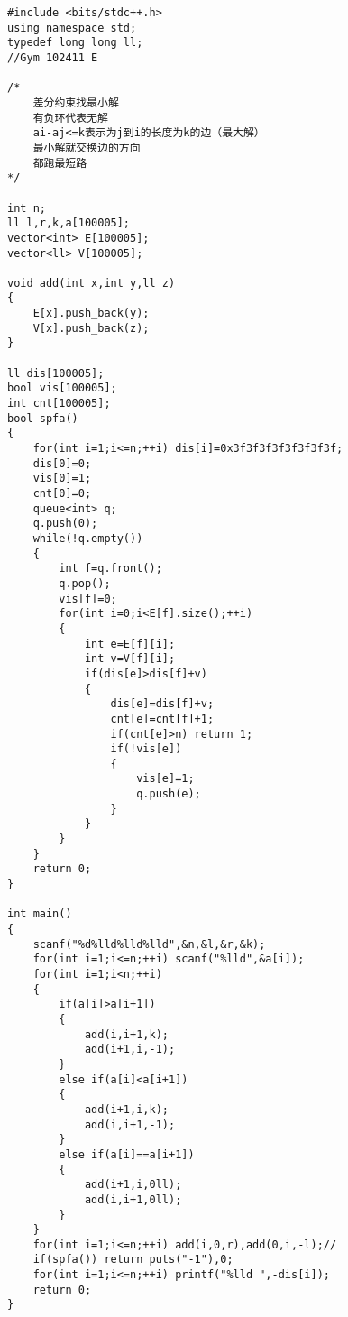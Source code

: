 ﻿\begin{lstlisting}
#include <bits/stdc++.h>
using namespace std;
typedef long long ll;
//Gym 102411 E

/*
	差分约束找最小解
	有负环代表无解
	ai-aj<=k表示为j到i的长度为k的边（最大解）
	最小解就交换边的方向
	都跑最短路
*/
 
int n;
ll l,r,k,a[100005];
vector<int> E[100005];
vector<ll> V[100005];
 
void add(int x,int y,ll z)
{
	E[x].push_back(y);
	V[x].push_back(z);
}
 
ll dis[100005];
bool vis[100005];
int cnt[100005];
bool spfa()
{
	for(int i=1;i<=n;++i) dis[i]=0x3f3f3f3f3f3f3f3f;
	dis[0]=0;
	vis[0]=1;
	cnt[0]=0;
	queue<int> q;
	q.push(0);
	while(!q.empty())
	{
		int f=q.front();
		q.pop();
		vis[f]=0;
		for(int i=0;i<E[f].size();++i)
		{
			int e=E[f][i];
			int v=V[f][i];
			if(dis[e]>dis[f]+v)
			{
				dis[e]=dis[f]+v;
				cnt[e]=cnt[f]+1;
				if(cnt[e]>n) return 1;
				if(!vis[e])
				{
					vis[e]=1;
					q.push(e);
				}
			}
		}
	}
	return 0;
}
 
int main()
{
	scanf("%d%lld%lld%lld",&n,&l,&r,&k);
	for(int i=1;i<=n;++i) scanf("%lld",&a[i]);
	for(int i=1;i<n;++i)
	{
		if(a[i]>a[i+1])
		{
			add(i,i+1,k);
			add(i+1,i,-1);
		}
		else if(a[i]<a[i+1])
		{
			add(i+1,i,k);
			add(i,i+1,-1);
		}
		else if(a[i]==a[i+1])
		{
			add(i+1,i,0ll);
			add(i,i+1,0ll);
		}
	}
	for(int i=1;i<=n;++i) add(i,0,r),add(0,i,-l);//
	if(spfa()) return puts("-1"),0;
	for(int i=1;i<=n;++i) printf("%lld ",-dis[i]);
	return 0;
}
\end{lstlisting}